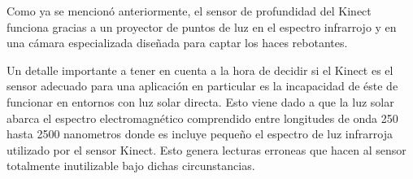 Como ya se mencionó anteriormente, el sensor de profundidad del Kinect funciona gracias a un proyector de puntos de luz en el espectro infrarrojo y en una cámara especializada diseñada para captar los haces rebotantes.

Un detalle importante a tener en cuenta a la hora de decidir si el Kinect es el sensor adecuado para una aplicación en particular es la incapacidad de éste de funcionar en entornos con luz solar directa. Esto viene dado a que la luz solar abarca el espectro electromagnético comprendido entre longitudes de onda 250 hasta 2500 nanometros donde es incluye pequeño el espectro de luz infrarroja utilizado por el sensor Kinect. Esto genera lecturas erroneas que hacen al sensor totalmente inutilizable bajo dichas circunstancias.


